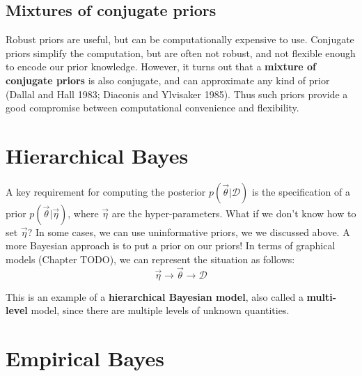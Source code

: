\subsection{Mixtures of conjugate priors}
Robust priors are useful, but can be computationally expensive to use. Conjugate priors simplify the computation, but are often not robust, and not flexible enough to encode our prior knowledge. However, it turns out that a \textbf{mixture of conjugate priors} is also conjugate, and can approximate any kind of prior (Dallal and Hall 1983; Diaconis and Ylvisaker 1985). Thus such priors provide a good compromise between computational convenience and flexibility.


\section{Hierarchical Bayes}
A key requirement for computing the posterior $p(\vec{\theta}|\mathcal{D})$ is the specification of a prior $p(\vec{\theta}|\vec{\eta})$, where $\vec{\eta}$ are the hyper-parameters. What if we don’t know how to set $\vec{\eta}$? In some cases, we can use uninformative priors, we we discussed above. A more Bayesian approach is to put a prior on our priors! In terms of graphical models (Chapter TODO), we can represent the situation as follows:
\begin{equation}
\vec{\eta} \rightarrow \vec{\theta} \rightarrow \mathcal{D}
\end{equation}

This is an example of a \textbf{hierarchical Bayesian model}, also called a \textbf{multi-level} model, since there are multiple levels of unknown quantities. 


\section{Empirical Bayes}
\label{sec:Empirical-Bayes}

